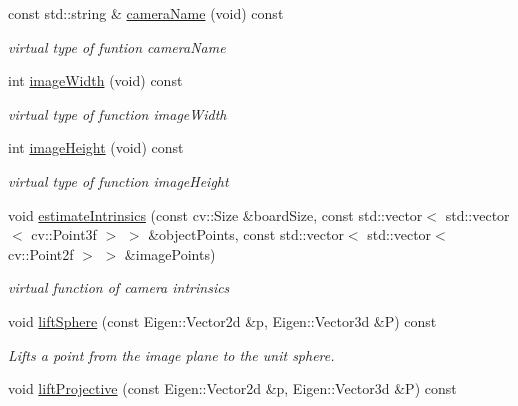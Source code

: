 \begin{DoxyCompactItemize}
const std\+::string \& \hyperlink{classcamodocal_1_1CataCamera_a0d7729df53b75f8c616a8fc43b7aba13}{camera\+Name} (void) const
\begin{DoxyCompactList}\small\item\em virtual type of funtion camera\+Name \end{DoxyCompactList}\item 
\mbox{\label{classcamodocal_1_1CataCamera_a12efd82807e3f3baa13c3d5e344ac6a4}} 
int \hyperlink{classcamodocal_1_1CataCamera_a12efd82807e3f3baa13c3d5e344ac6a4}{image\+Width} (void) const
\begin{DoxyCompactList}\small\item\em virtual type of function image\+Width \end{DoxyCompactList}\item 
\mbox{\label{classcamodocal_1_1CataCamera_a858e474daed69f8bbe3aa6d6a1e7d3cc}} 
int \hyperlink{classcamodocal_1_1CataCamera_a858e474daed69f8bbe3aa6d6a1e7d3cc}{image\+Height} (void) const
\begin{DoxyCompactList}\small\item\em virtual type of function image\+Height \end{DoxyCompactList}\item 
\mbox{\label{classcamodocal_1_1CataCamera_a1dae6c4e661280dfaa3674df02f76e9c}} 
void \hyperlink{classcamodocal_1_1CataCamera_a1dae6c4e661280dfaa3674df02f76e9c}{estimate\+Intrinsics} (const cv\+::\+Size \&board\+Size, const std\+::vector$<$ std\+::vector$<$ cv\+::\+Point3f $>$ $>$ \&object\+Points, const std\+::vector$<$ std\+::vector$<$ cv\+::\+Point2f $>$ $>$ \&image\+Points)
\begin{DoxyCompactList}\small\item\em virtual function of camera intrinsics \end{DoxyCompactList}\item 
void \hyperlink{classcamodocal_1_1CataCamera_ad408a25dbeabac661788d16357b44504}{lift\+Sphere} (const Eigen\+::\+Vector2d \&p, Eigen\+::\+Vector3d \&P) const
\begin{DoxyCompactList}\small\item\em Lifts a point from the image plane to the unit sphere. \end{DoxyCompactList}\item 
void \hyperlink{classcamodocal_1_1CataCamera_a8415dca7d06b730a0b7358745aaa4001}{lift\+Projective} (const Eigen\+::\+Vector2d \&p, Eigen\+::\+Vector3d \&P) const

\end{DoxyCompactItemize}
